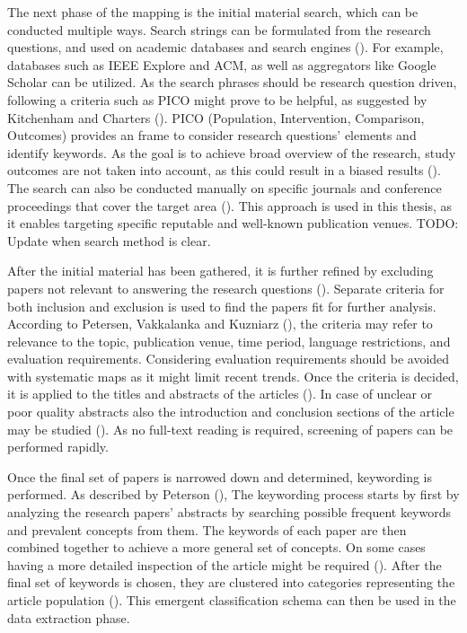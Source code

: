 \documentclass[utf8,english]{gradu3}
\begin{document}
The next phase of the mapping is the initial material search, which can be
conducted multiple ways. Search strings can be formulated from the research
questions, and used on academic databases and search engines
(\cite{petersen2008}). For example, databases such as IEEE Explore and ACM, as
well as aggregators like Google Scholar can be utilized. As the search phrases
should be research question driven, following a criteria such as PICO might
prove to be helpful, as suggested by Kitchenham and Charters
(\cite*{kitchenham2007}). PICO (Population, Intervention, Comparison, Outcomes)
provides an frame to consider research questions' elements and identify
keywords. As the goal is to achieve broad overview of the research, study
outcomes are not taken into account, as this could result in a biased results
(\cite{petersen2008}). The search can also be conducted manually on specific
journals and conference proceedings that cover the target area
(\cite{petersen2008}). This approach is used in this thesis, as it enables
targeting specific reputable and well-known publication venues. TODO: Update
when search method is clear.

After the initial material has been gathered, it is further refined by excluding
papers not relevant to answering the research questions (\cite{petersen2008}).
Separate criteria for both inclusion and exclusion is used to find the papers
fit for further analysis. According to Petersen, Vakkalanka and Kuzniarz
(\cite*{petersen2015}), the criteria may refer to relevance to the topic,
publication venue, time period, language restrictions, and evaluation
requirements. Considering evaluation requirements should be avoided with
systematic maps as it might limit recent trends. Once the criteria is decided,
it is applied to the titles and abstracts of the articles (\cite{petersen2015}).
In case of unclear or poor quality abstracts also the introduction and
conclusion sections of the article may be studied (\cite{petersen2008}). As no
full-text reading is required, screening of papers can be performed rapidly.

Once the final set of papers is narrowed down and determined, keywording is
performed. As described by Peterson (\cite*{petersen2008}), The keywording
process starts by first by analyzing the research papers' abstracts by searching
possible frequent keywords and prevalent concepts from them. The keywords of
each paper are then combined together to achieve a more general set of concepts.
On some cases having a more detailed inspection of the article might be required
(\cite{petersen2008,petersen2015}). After the final set of keywords is chosen,
they are clustered into categories representing the article population
(\cite{petersen2008}). This emergent classification schema can then be used in
the data extraction phase. 
\end{document}
